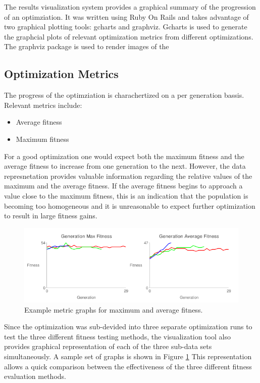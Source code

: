 The results visualization system provides a graphical summary of the progression of an optimziation. It was written using Ruby On Rails and takes advantage of two graphical plotting tools: gcharts and graphviz. Gcharts is used to generate the graphcial plots of relevant optimization metrics from different optimizations. The graphviz package is used to render images of the 

\subsection{Optimization Metrics}
The progress of the optimziation is charachertized on a per generation bassis. Relevant metrics include: 
\begin{itemize}
	\item Average fitness
	\item Maximum fitness
\end{itemize}

For a good optimization one would expect both the maximum fitness and the average fitness to increase from one generation to the next. However, the data represnetation provides valuable information regarding the relative values of the maximum and the average fitness. If the average fitness begins to approach a value close to the maximum fitness, this is an indication that the population is becoming too homogeneous and it is unreasonable to expect further optimization to result in large fitness gains.
\begin{figure}[!htb]
  \centering
  \includegraphics[width = .75\textwidth]{images/sample_graphs}
  \caption{Example metric graphs for maximum and average fitness. \label{fig:sample_graphs}}
\end{figure}
Since the optimization was sub-devided into three separate optimization runs to test the three different fitness testing methods, the visualization tool also provides graphical representation of each of the three sub-data sets simultaneously. A sample set of graphs is shown in Figure \ref{fig:sample_graphs} This representation allows a quick comparison between the effectiveness of the three different fitness evaluation methods.  

